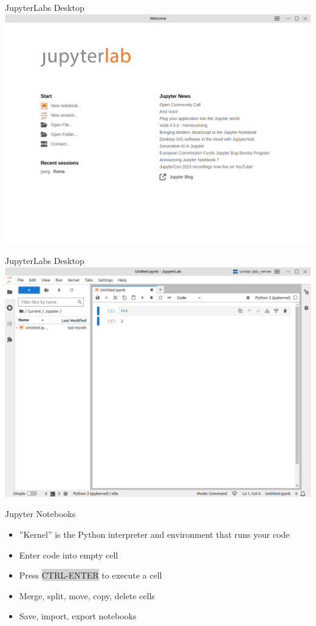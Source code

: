 \documentclass[ignorenonframetext,xcolor=x11names]{beamer}
\begin{document}
\begin{frame}{JupyterLabs Desktop}
\includegraphics[width=\textwidth]{screen1.png}
\end{frame}

\begin{frame}{JupyterLabs Desktop}
\includegraphics[width=\textwidth]{screen2.png}
\end{frame}

\begin{frame}{Jupyter Notebooks}
\begin{itemize}
  \item ''Kernel'' is the Python interpreter and environment that runs your code
  \item Enter code into empty cell
  \item Press \colorbox{lightgray}{CTRL-ENTER} to execute a cell
  \item Merge, split, move, copy, delete cells
  \item Save, import, export notebooks
\end{itemize}
\end{frame}
\end{document}
